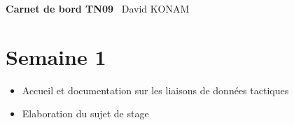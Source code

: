 \documentclass[11pt,fleqn]{book}
\begin{document}
\begingroup
\thispagestyle{empty}
\centering
\vspace*{5cm}
\par\normalfont\fontsize{35}{35}\sffamily\selectfont
\textbf{Carnet de bord TN09}\
\vspace*{1cm}
{\Huge David KONAM}\par %
\endgroup
{} %
							\pagestyle{empty} %
							\tableofcontents %
							\pagestyle{fancy} %
								\chapter{Semaine 1}
\begin{itemize}
\item Accueil  et  documentation  sur  les  liaisons  de  données  tactiques
\item Elaboration  du  sujet  de  stage
\end{itemize}
~\\
\end{document}
